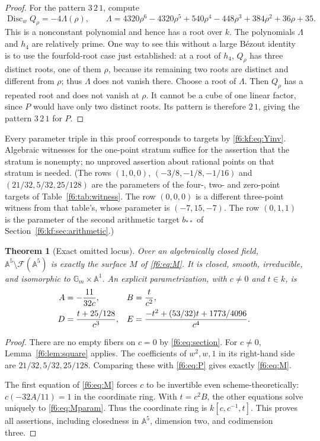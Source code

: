 \documentclass[11pt,a4paper]{article}
\newtheorem{theorem}{Theorem}[section]
\theoremstyle{definition}
\newcommand{\A}{\mathbb A}
\newcommand{\Gm}{\mathbb G_m}
\newcommand{\Disc}{\operatorname{Disc}}
\newcommand{\F}{\mathcal F}
\begin{document}
\begin{proof}
For the pattern $3\,2\,1$, compute
\begin{equation}\label{f6:kf:eq:K}
\Disc_wQ_\rho=-4\Lambda(\rho),\qquad
\Lambda=4320\rho^6-4320\rho^5+540\rho^4-448\rho^3+384\rho^2+36\rho+35 .
\end{equation}
This is a nonconstant polynomial and hence has a root over $k$. The
polynomials $\Lambda$ and $h_4$ are relatively prime. One way to see this
without a large Bézout identity is to use the fourfold-root case just
established: at a root of $h_4$, $Q_\rho$ has three distinct roots, one of
them $\rho$, because its remaining two roots are distinct and different from
$\rho$; thus $\Lambda$ does not vanish there. Choose a root of $\Lambda$.
Then $Q_\rho$ has a repeated root and does not vanish at $\rho$. It cannot be
a cube of one linear factor, since $P$ would have only two distinct roots.
Its pattern is therefore $2\,1$, giving the pattern $3\,2\,1$ for $P$.
\end{proof}

Every parameter triple in this proof corresponds to targets by
\eqref{f6:kf:eq:Yinv}. Algebraic witnesses for the one-point stratum suffice
for the assertion that the stratum is nonempty; no unproved assertion about
rational points on that stratum is needed. (The rows $(1,0,0)$,
$(-3/8,-1/8,-1/16)$ and $(21/32,5/32,25/128)$ are the parameters of the
four-, two- and zero-point targets of Table~\ref{f6:tab:witness}. The row
$(0,0,0)$ is a different three-point witness from that table's, whose
parameter is $(-7,15,-7)$. The row $(0,1,1)$ is the parameter of the second
arithmetic target $b_{**}$ of Section~\ref{f6:kf:sec:arithmetic}.)

\begin{theorem}[Exact omitted locus]\label{f6:thm:omitted}
Over an algebraically closed field, $\A^5\setminus\F(\A^5)$ is exactly
the surface $M$ of \eqref{f6:eq:M}. It is closed, smooth, irreducible, and
isomorphic to $\Gm\times\A^1$. An explicit parametrization, with
$c\ne0$ and $t\in k$, is
\begin{align}
 A&=-\frac{11}{32c},& B&=\frac{t}{c^2},\notag\\
 D&=\frac{t+25/128}{c^3},&
 E&=\frac{-t^2+(53/32)t+1773/4096}{c^4}.
 \label{f6:eq:Mparam}
\end{align}
\end{theorem}
\begin{proof}
There are no empty fibers on $c=0$ by \eqref{f6:eq:section}. For $c\ne0$,
Lemma~\ref{f6:lem:square} applies. The coefficients of $w^2,w,1$ in its
right-hand side are $21/32,5/32,25/128$. Comparing these with
\eqref{f6:eq:P} gives exactly \eqref{f6:eq:M}.

The first equation of \eqref{f6:eq:M} forces $c$ to be invertible even
scheme-theoretically: $c(-32A/11)=1$ in the coordinate ring. With
$t=c^2B$, the other equations solve uniquely to \eqref{f6:eq:Mparam}.
Thus the coordinate ring is $k[c,c^{-1},t]$. This proves all assertions,
including closedness in $\A^5$, dimension two, and codimension three.
\end{proof}
\end{document}
